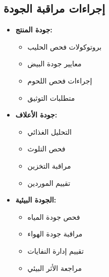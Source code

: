 \subsection{إجراءات مراقبة الجودة}
\begin{itemize}
    \item \textbf{جودة المنتج:}
    \begin{itemize}
        \item بروتوكولات فحص الحليب
        \item معايير جودة البيض
        \item إجراءات فحص اللحوم
        \item متطلبات التوثيق
    \end{itemize}
    
    \item \textbf{جودة الأعلاف:}
    \begin{itemize}
        \item التحليل الغذائي
        \item فحص التلوث
        \item مراقبة التخزين
        \item تقييم الموردين
    \end{itemize}
    
    \item \textbf{الجودة البيئية:}
    \begin{itemize}
        \item فحص جودة المياه
        \item مراقبة جودة الهواء
        \item تقييم إدارة النفايات
        \item مراجعة الأثر البيئي
    \end{itemize}
\end{itemize}

